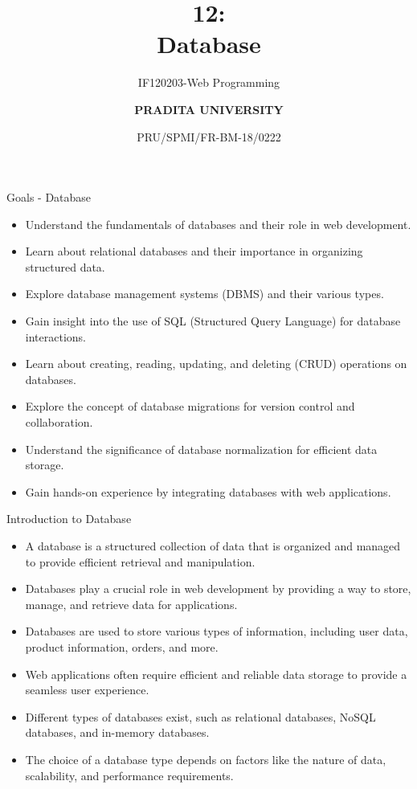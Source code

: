 \documentclass[aspectratio=169, table]{beamer}
\subtitle{IF120203-Web Programming}
\title{\Huge {\textbf{12: \\Database}}}
\date[Serial]{\scriptsize {PRU/SPMI/FR-BM-18/0222}}
\author[Pradita]{\small {\textbf{PRADITA UNIVERSITY}}}
\begin{document}
\begin{frame}
    \titlepage
\end{frame}

\begin{frame}{Goals - Database}
    \vskip1cm
    \begin{itemize}
        \item Understand the fundamentals of databases and their role in web development.
        \item Learn about relational databases and their importance in organizing structured data.
        \item Explore database management systems (DBMS) and their various types.
        \item Gain insight into the use of SQL (Structured Query Language) for database interactions.
        \item Learn about creating, reading, updating, and deleting (CRUD) operations on databases.
        \item Explore the concept of database migrations for version control and collaboration.
        \item Understand the significance of database normalization for efficient data storage.
        \item Gain hands-on experience by integrating databases with web applications.
    \end{itemize}
\end{frame}

\begin{frame}{Introduction to Database}
    \vskip1cm
    \begin{itemize}
        \item A database is a structured collection of data that is organized and managed to provide efficient retrieval and manipulation.
        \item Databases play a crucial role in web development by providing a way to store, manage, and retrieve data for applications.
        \item Databases are used to store various types of information, including user data, product information, orders, and more.
        \item Web applications often require efficient and reliable data storage to provide a seamless user experience.
        \item Different types of databases exist, such as relational databases, NoSQL databases, and in-memory databases.
        \item The choice of a database type depends on factors like the nature of data, scalability, and performance requirements.
    \end{itemize}
\end{frame}
\end{document}
